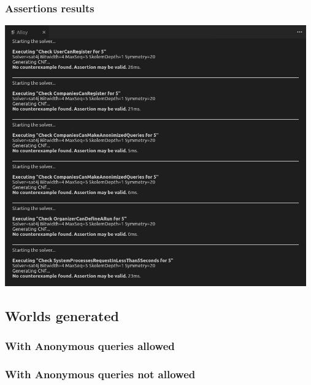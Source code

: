 \documentclass[a4paper,oneside,11pt]{article}
\begin{document}
                \subsubsection{Assertions results}
                \begin{center}
                    \includegraphics[width=13cm]{assets/alloyresults.jpeg}
                \end{center}
            \subsection{Worlds generated}
                \subsubsection{With Anonymous queries allowed}
                    
                \subsubsection{With Anonymous queries not allowed}
                
\end{document}
